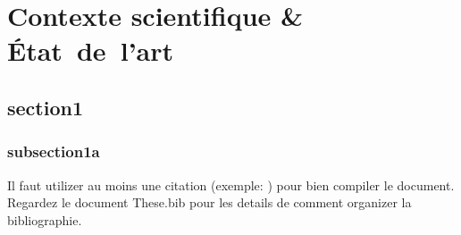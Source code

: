 \documentclass[a4paper,11pt,twoside]{StyleThese}
\begin{document}
\setcounter{chapter}{0} %
\dominitoc
\faketableofcontents
\fi

\chapter{Contexte scientifique \& État~de~l'art}
\minitoc

\section{section1}
\subsection{subsection1a}

Il faut utilizer au moins une citation (exemple: \cite{goossens93}) pour bien
compiler le document. Regardez le document These.bib pour les details de
comment organizer la bibliographie.

\ifdefined{}
\else


\end{document}
